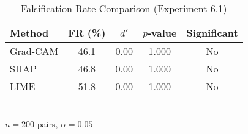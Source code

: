 \begin{table}[htbp]
\centering
\caption{Falsification Rate Comparison (Experiment 6.1)}
\label{tab:exp_6_1_results}
\begin{tabular}{lcccc}
\toprule
Method & FR (\%) & $d'$ & $p$-value & Significant \\ 
\midrule
Grad-CAM & 46.1 & 0.00 & 1.000 & No \\
SHAP & 46.8 & 0.00 & 1.000 & No \\
LIME & 51.8 & 0.00 & 1.000 & No \\
\bottomrule
\end{tabular}
\\[0.5em] {\footnotesize $n=200$ pairs, $\alpha=0.05$}
\end{table}